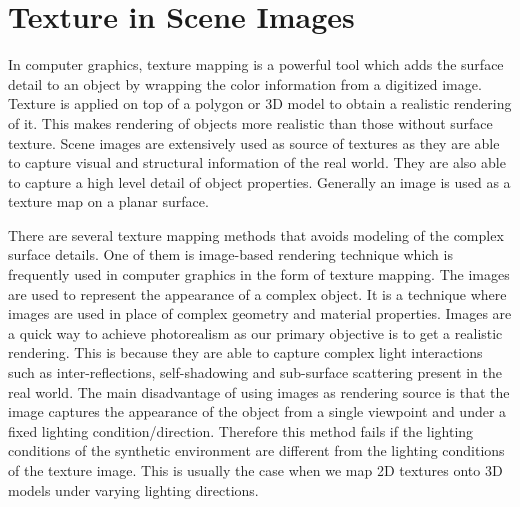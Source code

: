 
\section{Texture in Scene Images}

In computer graphics, texture mapping is a powerful tool which adds the surface detail to an object by wrapping
the color information from a digitized image. 
Texture is applied on top of a
polygon or 3D model to obtain a realistic rendering of it.
This makes rendering of objects more realistic than those without
surface texture. 
Scene images are extensively
used as source of textures as they are able to capture visual and structural information of the real world. They
are also able to capture a high level detail of object properties.
Generally an image is used as a texture map
on a planar surface. 

There are several texture mapping methods that avoids
modeling of the complex surface details. 
One of them is image-based rendering technique which is frequently used in computer graphics
in the form of texture mapping. The images are used to represent the appearance of a complex object.
It is a technique where images are used in place of complex geometry and material 
properties. Images are a quick way to achieve photorealism as our primary objective is to get 
a realistic rendering. This is because they are able to capture 
complex light interactions such as inter-reflections,
self-shadowing and sub-surface scattering present in the real world.
The main disadvantage of using images as rendering source is that the image captures the
appearance of the object from a single viewpoint and under a fixed lighting condition/direction. 
Therefore this method fails if the lighting conditions of the synthetic
environment are different from the lighting conditions of the texture image. This
is usually the case when we map 2D textures onto 3D models under varying lighting directions. 

